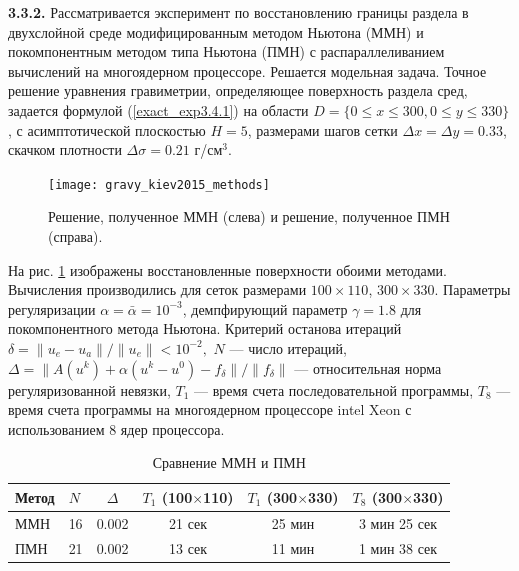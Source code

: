{\bfseries 3.3.2.} Рассматривается эксперимент по восстановлению границы раздела в двухслойной среде модифицированным методом Ньютона (ММН) и покомпонентным методом типа Ньютона (ПМН) с распараллеливанием вычислений на многоядерном процессоре. Решается модельная задача. Точное решение уравнения гравиметрии, определяющее поверхность раздела сред, задается формулой (\ref{exact_exp3.4.1}) на области $D=\{0\le x\le 300, 0\le y\le 330\}$, с асимптотической плоскостью $  H=5$, размерами шагов сетки $\Delta x=\Delta y=0.33$, скачком плотности $\Delta\sigma=0.21$ г/см$^3$.
\begin{figure}
	\centering
	\texttt{[image: gravy\_kiev2015\_methods]}
	\caption{Решение, полученное ММН (слева) и решение, полученное ПМН (справа).}
	\label{fig:gravy_kiev2015_methods}
\end{figure}
На рис. \ref{fig:gravy_kiev2015_methods} изображены восстановленные поверхности обоими методами. Вычисления производились для сеток размерами $100\times 110$, $300\times 330$. Параметры регуляризации $\alpha=\bar{\alpha}=10^{-3}$, демпфирующий параметр $\gamma=1.8$ для покомпонентного метода Ньютона. Критерий останова итераций $\delta=\|u_e-u_a\|/\|u_e\|<10^{-2},$ $N$ --- число итераций, 
$\Delta=\|A(u^k)+\alpha(u^k-u^0)-f_\delta\|/\|f_\delta\|$ --- относительная норма регуляризованной невязки, $T_1$ --- время счета последовательной программы, $T_8$ --- время счета программы на многоядерном процессоре intel Xeon с использованием 8 ядер процессора.
\begin{table}[]
	\centering
	\caption{Сравнение ММН и ПМН}
	\label{table3.5}
	\begin{tabular}{|p{}|p{}|c|c|c|c|}
		\hline
		\multicolumn{1}{|c|}{\textbf{Метод}} & \textbf{$N$} &
		\textbf{$\Delta$} & \textbf{$T_1$ (100$\times$110)} & \textbf{$T_1$ (300$\times$330)} & \textbf{$T_8$ (300$\times$330)} \\ \hline
		ММН       & 16             &    0.002     & 21 сек          & 25 мин          & 3 мин 25 сек    \\ \hline
		ПМН    & 21             &     0.002    & 13 сек          & 11 мин          & 1 мин 38 сек    \\ \hline
	\end{tabular}
\end{table}

